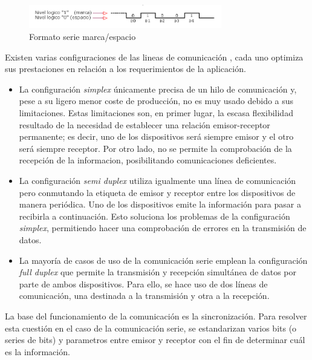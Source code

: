 \begin{figure}[tb]
\centering
\includegraphics[width=0.75\textwidth]{figuras/marcaespacio.png}
\caption{Formato serie marca/espacio}
\label{fig:marcaespacio}
\end{figure}

Existen varias configuraciones de las lineas de comunicación \cite{DispLogicos}, cada uno optimiza sus prestaciones en relación a los requerimientos de la aplicación.
\begin{itemize}
\item La configuración \textit{simplex} únicamente precisa de un hilo de comunicación y, pese a su ligero menor coste de producción, no es muy usado debido a sus limitaciones. Estas limitaciones son, en primer lugar, la escasa flexibilidad resultado de la necesidad de establecer una relación emisor-receptor permanente; es decir, uno de los dispositivos será siempre emisor y el otro será siempre receptor. Por otro lado, no se permite la comprobación de la recepción de la informacion, posibilitando comunicaciones deficientes.
\item La configuración \textit{semi duplex} utiliza igualmente una línea de comunicación pero conmutando la etiqueta de emisor y receptor entre los dispositivos de manera periódica. Uno de los dispositivos emite la información para pasar a recibirla a continuación. Esto soluciona los problemas de la configuración \textit{simplex}, permitiendo hacer una comprobación de errores en la transmisión de datos.
\item La mayoría de casos de uso de la comunicación serie emplean la configuración \textit{full duplex} que permite la transmisión y recepción simultánea de datos por parte de ambos dispositivos. Para ello, se hace uso de dos líneas de comunicación, una destinada a la transmisión y otra a la recepción.
\end{itemize}

La base del funcionamiento de la comunicación es la sincronización. Para resolver esta cuestión en el caso de la comunicación serie, se estandarizan varios bits (o series de bits) y parametros entre emisor y receptor con el fin de determinar cuál es la información.

